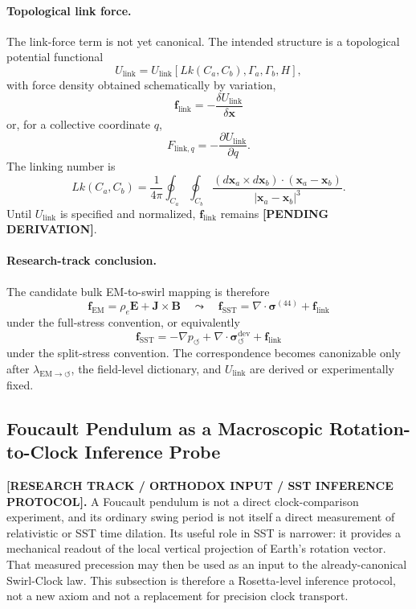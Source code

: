 \paragraph{Topological link force.}
The link-force term is not yet canonical.  The intended structure is a
topological potential functional
\[
U_{\mathrm{link}}
=
U_{\mathrm{link}}\!\left[
Lk(C_a,C_b),\Gamma_a,\Gamma_b,H
\right],
\]
with force density obtained schematically by variation,
\[
\boxed{
\mathbf f_{\mathrm{link}}
=
-\frac{\delta U_{\mathrm{link}}}{\delta \mathbf x}
}
\]
or, for a collective coordinate \(q\),
\[
\boxed{
F_{\mathrm{link},q}
=
-\frac{\partial U_{\mathrm{link}}}{\partial q}.
}
\]
The linking number is
\[
Lk(C_a,C_b)
=
\frac{1}{4\pi}
\oint_{C_a}\oint_{C_b}
\frac{
(d\mathbf x_a\times d\mathbf x_b)\cdot(\mathbf x_a-\mathbf x_b)
}{
|\mathbf x_a-\mathbf x_b|^3
}.
\]
Until \(U_{\mathrm{link}}\) is specified and normalized,
\(\mathbf f_{\mathrm{link}}\) remains
\textbf{[PENDING DERIVATION]}.

\paragraph{Research-track conclusion.}
The candidate bulk EM-to-swirl mapping is therefore
\[
\boxed{
\mathbf f_{\mathrm{EM}}
=
\rho_e\mathbf E+\mathbf J\times\mathbf B
\quad\leadsto\quad
\mathbf f_{\mathrm{SST}}
=
\nabla\cdot\boldsymbol{\sigma}^{(44)}
+
\mathbf f_{\mathrm{link}}
}
\]
under the full-stress convention, or equivalently
\[
\boxed{
\mathbf f_{\mathrm{SST}}
=
-\nabla p_{\circlearrowleft}
+
\nabla\cdot\boldsymbol{\sigma}^{\mathrm{dev}}_{\circlearrowleft}
+
\mathbf f_{\mathrm{link}}
}
\]
under the split-stress convention.  The correspondence becomes canonizable
only after
\(\lambda_{\mathrm{EM}\to\circlearrowleft}\),
the field-level dictionary, and
\(U_{\mathrm{link}}\)
are derived or experimentally fixed.


\subsection{Foucault Pendulum as a Macroscopic Rotation-to-Clock Inference Probe}
\label{subsec:rt_foucault_swirl_clock_probe}

\textbf{[RESEARCH TRACK / ORTHODOX INPUT / SST INFERENCE PROTOCOL].}
A Foucault pendulum is not a direct clock-comparison experiment, and its ordinary swing period is not itself a direct measurement of relativistic or SST time dilation.  Its useful role in SST is narrower: it provides a mechanical readout of the local vertical projection of Earth's rotation vector.  That measured precession may then be used as an input to the already-canonical Swirl-Clock law.  This subsection is therefore a Rosetta-level inference protocol, not a new axiom and not a replacement for precision clock transport.

